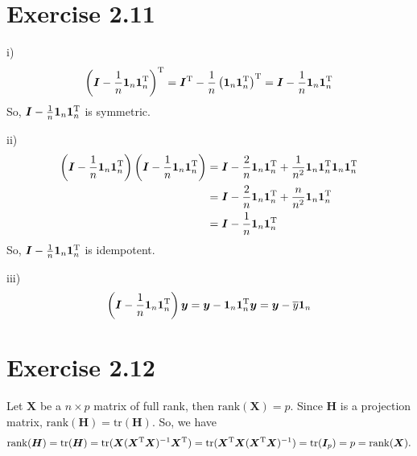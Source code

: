 \documentclass[a4paper]{article}
\begin{document}
\vspace{\baselineskip}
\section{Exercise 2.11}
i)\\
\begin{align*}
\left(\bm{I} -\frac{1}{n}\bm{1}_{n}\bm{1}_{n}^{\rm T}\right)^{\rm T} = \bm{I}^{\rm T} -\frac{1}{n}\left(\bm{1}_{n}\bm{1}_{n}^{\rm T}\right)^{\rm T} = \bm{I} -\frac{1}{n}\bm{1}_{n}\bm{1}_{n}^{\rm T}
\end{align*}
So, $\bm{I} -\frac{1}{n}\bm{1}_{n}\bm{1}_{n}^{\rm T}$ is symmetric.

ii)\\
\begin{align*}
\left(\bm{I} -\frac{1}{n}\bm{1}_{n}\bm{1}_{n}^{\rm T}\right)\left(\bm{I} -\frac{1}{n}\bm{1}_{n}\bm{1}_{n}^{\rm T}\right)
&= \bm{I} -\frac{2}{n}\bm{1}_{n}\bm{1}_{n}^{\rm T} +\frac{1}{n^2}\bm{1}_{n}\bm{1}_{n}^{\rm T}\bm{1}_{n}\bm{1}_{n}^{\rm T}\\
&= \bm{I} -\frac{2}{n}\bm{1}_{n}\bm{1}_{n}^{\rm T} +\frac{n}{n^2}\bm{1}_{n}\bm{1}_{n}^{\rm T}\\
&= \bm{I} -\frac{1}{n}\bm{1}_{n}\bm{1}_{n}^{\rm T}
\end{align*}
So, $\bm{I} -\frac{1}{n}\bm{1}_{n}\bm{1}_{n}^{\rm T}$ is idempotent.

iii)\\
\begin{align*}
\left(\bm{I} -\frac{1}{n}\bm{1}_{n}\bm{1}_{n}^{\rm T}\right)\bm{y}
= \bm{y} - \bm{1}_{n}\bm{1}_{n}^{\rm T}\bm{y}
= \bm{y} - \overline{y}\bm{1}_{n}
\end{align*}

\vspace{\baselineskip}
\section{Exercise 2.12}
Let $\bm{X}$ be a $n \times p$ matrix of full rank, then $\mathrm{rank}(\bm{X}) = p$. Since $\bm{H}$ is a projection matrix, $\mathrm{rank}(\bm{H}) = \mathrm{tr}(\bm{H})$. So, we have
\begin{align*}
\mathrm{rank}(\bm{H}) = \mathrm{tr}(\bm{H}) = \mathrm{tr}(\bm{X}(\bm{X}^{\rm T}\bm{X})^{-1}\bm{X}^{\rm T}) = \mathrm{tr}(\bm{X}^{\rm T}\bm{X}(\bm{X}^{\rm T}\bm{X})^{-1}) = \mathrm{tr}(\bm{I}_{p}) = p = \mathrm{rank}(\bm{X}).
\end{align*}

\vspace{\baselineskip}
\end{document}
